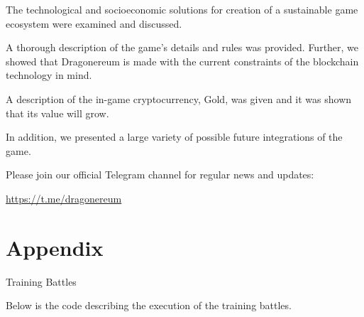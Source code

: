 \documentclass[12pt]{article}
\begin{document}
The technological and socioeconomic solutions for creation of a sustainable game ecosystem were examined and discussed.\par

A thorough description of the game’s details and rules was provided. Further, we showed that Dragonereum is made with the current constraints of the blockchain technology in mind.\par

A description of the in-game cryptocurrency, Gold, was given and it was shown that its value will grow.  \par

In addition, we presented a large variety of possible future integrations of the game.\par


\vspace{\baselineskip}

\vspace{\baselineskip}
Please join our official Telegram channel for regular news and updates:\par

\href{https://t.me/dragonereum}{\textcolor[HTML]{1155CC}{\uline{https://t.me/dragonereum}}}\par



 

\newpage
\printbibliography

\newpage
\section*{Appendix}


  \begin{Large}
  {Training Battles}%
  \end{Large}


\vspace{\baselineskip}
Below is the code describing the execution of the training battles.\par
\end{document}
